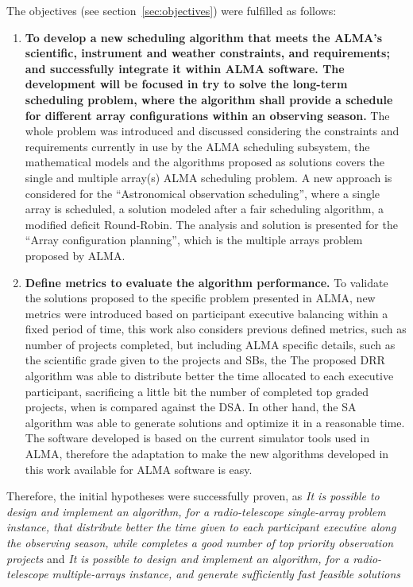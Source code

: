The objectives (see section~\ref{sec:objectives}) were fulfilled as follows:
\begin{enumerate}
\item \textbf{To develop a new scheduling algorithm that meets the ALMA’s scientific, instrument and
weather constraints, and requirements; and successfully integrate it within ALMA software.
The development will be focused in try to solve the long-term scheduling problem, where
the algorithm shall provide a schedule for different array configurations within an
observing season.} The whole problem was introduced and discussed considering the constraints and requirements currently in use by the ALMA scheduling subsystem, the mathematical models and the algorithms proposed as solutions covers the single and multiple array(s) ALMA scheduling problem. A new approach is considered for the ``Astronomical observation scheduling'', where a single array is scheduled, a solution modeled after a fair scheduling algorithm, a modified deficit Round-Robin. The analysis and solution is presented for the ``Array configuration planning'', which is the multiple arrays problem proposed by ALMA.
\item \textbf{Define metrics to evaluate the algorithm performance.} To validate the solutions proposed to the specific problem presented in ALMA, new metrics were introduced based on participant executive balancing within a fixed period of time, this work also considers previous defined metrics, such as number of projects completed, but including ALMA specific details, such as the scientific grade given to the projects and SBs, the The proposed DRR algorithm was able to distribute better the time allocated to each executive participant, sacrificing a little bit the number of completed top graded projects, when is compared against the DSA. In other hand, the SA algorithm was able to generate solutions and optimize it in a reasonable time. The software developed is based on the current simulator tools used in ALMA, therefore the adaptation to make the new algorithms developed in this work available for ALMA software is easy. 
\end{enumerate}

Therefore, the initial hypotheses were successfully proven, as \textit{It is possible to design and implement an algorithm, for a radio-telescope single-array problem instance, that distribute better the time given to each participant executive along the observing season, while completes a good number of top priority observation projects} and \textit{It is possible to design and implement an algorithm, for a radio-telescope multiple-arrays instance, and generate sufficiently fast feasible solutions}

